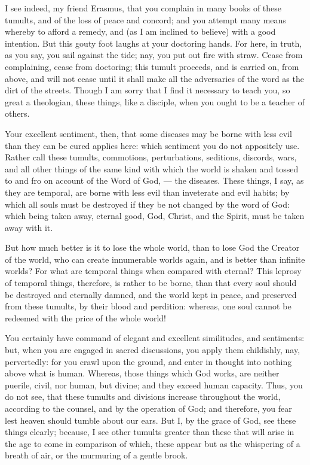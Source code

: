 I see indeed, my friend Erasmus, that you complain in many books of these tumults, and of the loss of peace and concord; and you attempt many means whereby to afford a remedy, and (as I am inclined to believe) with a good intention. But this gouty foot laughs at your doctoring hands. For here, in truth, as you say, you sail against the tide; nay, you put out fire with straw. Cease from complaining, cease from doctoring; this tumult proceeds, and is carried on, from above, and will not cease until it shall make all the adversaries of the word as the dirt of the streets. Though I am sorry that I find it necessary to teach you, so great a theologian, these things, like a disciple, when you ought to be a teacher of others.

Your excellent sentiment, then, that some diseases may be borne with less evil than they can be cured applies here: which sentiment you do not appositely use. Rather call these tumults, commotions, perturbations, seditions, discords, wars, and all other things of the same kind with which the world is shaken and tossed to and fro on account of the Word of God, — the diseases. These things, I say, as they are temporal, are borne with less evil than inveterate and evil habits; by which all souls must be destroyed if they be not changed by the word of God: which being taken away, eternal good, God, Christ, and the Spirit, must be taken away with it.

But how much better is it to lose the whole world, than to lose God the Creator of the world, who can create innumerable worlds again, and is better than infinite worlds? For what are temporal things when compared with eternal? This leprosy of temporal things, therefore, is rather to be borne, than that every soul should be destroyed and eternally damned, and the world kept in peace, and preserved from these tumults, by their blood and perdition: whereas, one soul cannot be redeemed with the price of the whole world!

You certainly have command of elegant and excellent similitudes, and sentiments: but, when you are engaged in sacred discussions, you apply them childishly, nay, pervertedly: for you crawl upon the ground, and enter in thought into nothing above what is human. Whereas, those things which God works, are neither puerile, civil, nor human, but divine; and they exceed human capacity. Thus, you do not see, that these tumults and divisions increase throughout the world, according to the counsel, and by the operation of God; and therefore, you fear lest heaven should tumble about our ears. But I, by the grace of God, see these things clearly; because, I see other tumults greater than these that will arise in the age to come in comparison of which, these appear but as the whispering of a breath of air, or the murmuring of a gentle brook.

